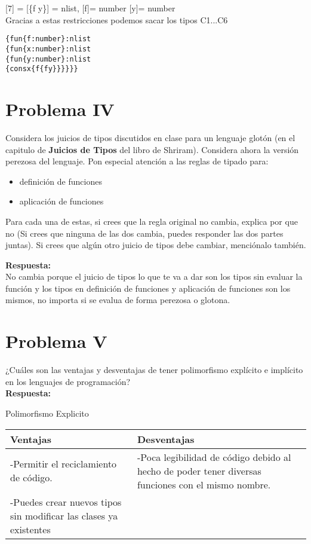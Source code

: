\documentclass{article}
\begin{document}
[$\boxed{7}$] = [\{f y\}] = nlist, [f]= number [y]= number\\


Gracias a estas restricciones podemos sacar los tipos C1...C6
\begin{alltt}
\{fun \{f : number \} : nlist
  \{fun \{x : number \} : nlist
    \{fun \{y : number \} : nlist
      \{cons x \{f \{f y\}\}\}\}\}\}
\end{alltt}


\section*{Problema IV}
Considera los juicios de tipos discutidos en clase para un lenguaje glotón
(en el capitulo de \textbf{Juicios de Tipos} del libro de Shriram).
Considera ahora la versión perezosa del lenguaje. Pon especial atención a
las reglas de tipado para:

\begin{itemize}
\item definición de funciones
\item aplicación de funciones
\end{itemize}

Para cada una de estas, si crees que la regla original no cambia, explica por que no
(Si crees que ninguna de las dos cambia, puedes responder las dos partes juntas).
Si crees que algún otro juicio de tipos debe cambiar, menciónalo también.

{\bf Respuesta: }\\

No cambia porque el juicio de tipos lo que te va a dar son los tipos sin evaluar la función y los tipos en definición de funciones y aplicación de funciones
son los mismos, no importa si se evalua de forma perezosa o glotona.

\section*{Problema V}
¿Cuáles son las ventajas y desventajas de tener polimorfismo explícito e implícito
en los lenguajes de programación?
\\
\textbf{Respuesta: }
\\


\begin{center}
Polimorfismo Explicito
\end{center}
\begin{tabularx}{\textwidth}{X|X}
	  \textbf{Ventajas} & \textbf{Desventajas} \\
	\hline
	-Permitir el reciclamiento de código. & -Poca legibilidad de código debido al hecho de poder tener diversas funciones con el mismo nombre. \\
	-Puedes crear nuevos tipos sin modificar las clases ya existentes & \\
\end{tabularx}
\end{document}
